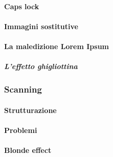 			\paragraph{Caps lock}
			\paragraph{Immagini sostitutive}
			\paragraph{La maledizione Lorem Ipsum}
				\subparagraph{L'effetto ghigliottina}
				
		\subsubsection{Scanning}
			\paragraph{Strutturazione}
			\paragraph{Problemi}
			\paragraph{Blonde effect}		